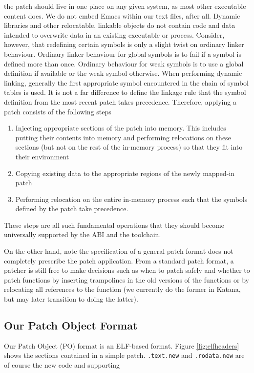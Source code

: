 the patch should live in one place on any given system, as most other
executable content does. We do not embed Emacs within our text files,
after all. Dynamic libraries and other relocatable, linkable objects
do not contain code and data intended to overwrite data in an existing
executable or process. Consider, however, that redefining certain
symbols is only a slight twist on ordinary linker behaviour. Ordinary
linker behaviour for global symbols is to fail if a symbol is defined
more than once. Ordinary behaviour for weak symbols is to use a global
definition if available or the weak symbol otherwise. When performing
dynamic linking, generally the first appropriate symbol encountered in
the chain of symbol tables is used. It is not a far difference to
define the linkage rule that the symbol definition from the most
recent patch takes precedence. Therefore, applying a patch consists of
the following steps
\begin{enumerate}
\item Injecting appropriate sections of the patch into memory. This
includes putting their contents into memory and performing relocations
on these sections (but not on the rest of the in-memory process) so
that they fit into their environment
\item Copying existing data to the appropriate regions of the newly
mapped-in patch
\item Performing relocation on the entire in-memory process such that the
symbols defined by the patch take precedence.
\end{enumerate}
These steps are all such fundamental operations that they should
become universally supported by the ABI and the toolchain. 

On the other hand, note the specification of a general patch
format does not completely prescribe the patch application. From a
standard patch format, a patcher is still free to make decisions such
as when to patch safely and whether to patch functions by inserting
trampolines in the old versions of the functions or by relocating all
references to the function (we currently do the former in Katana, but
may later transition to doing the latter).

\subsection{Our Patch Object Format}
Our Patch Object (PO) format is an ELF-based format. Figure
\ref{fig:elfheaders} shows the sections contained in a simple
patch. \texttt{.text.new} and \texttt{.rodata.new} are of course the
new code and supporting

